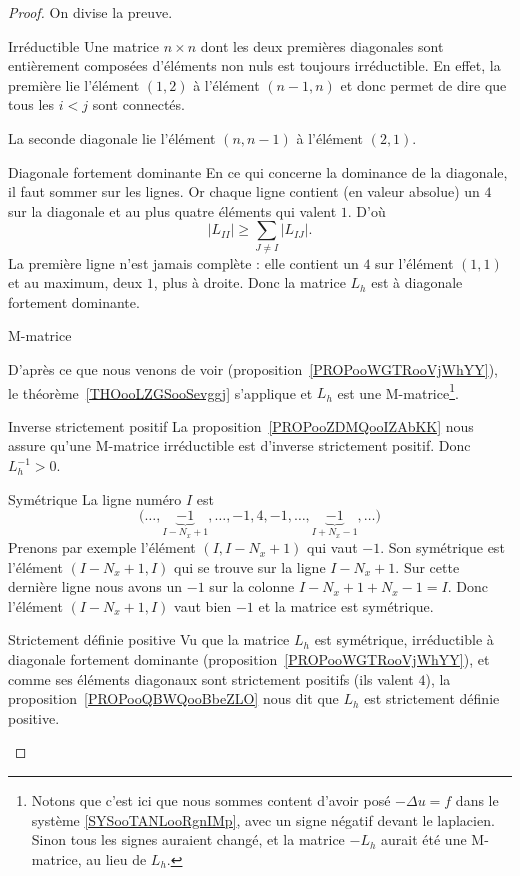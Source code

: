 \begin{proof}
	On divise la preuve.
	\begin{subproof}
		\item[Irréductible]
		Une matrice \( n\times n\) dont les deux premières diagonales sont entièrement composées d'éléments non nuls est toujours irréductible. En effet, la première lie l'élément \( (1,2)\) à l'élément \( (n-1,n)\) et donc permet de dire que tous les \( i<j\) sont connectés.

		La seconde diagonale lie l'élément \( (n,n-1)\) à l'élément \( (2,1)\).

		\item[Diagonale fortement dominante]
		En ce qui concerne la dominance de la diagonale, il faut sommer sur les lignes. Or chaque ligne contient (en valeur absolue) un \( 4\) sur la diagonale et au plus quatre éléments qui valent \( 1\). D'où
		\begin{equation}
			| L_{II} |\geq \sum_{J\neq I}| L_{IJ} |.
		\end{equation}
		La première ligne n'est jamais complète : elle contient un \( 4\) sur l'élément \( (1,1)\) et au maximum, deux \( 1\), plus à droite. Donc la matrice \( L_h\) est à diagonale fortement dominante.

		\item[M-matrice]
            
		D'après ce que nous venons de voir (proposition~\ref{PROPooWGTRooVjWhYY}), le théorème~\ref{THOooLZGSooSevggj} s'applique et \( L_h\) est une M-matrice\footnote{Notons que c'est ici que nous sommes content d'avoir posé \( -\Delta u=f\) dans le système \eqref{SYSooTANLooRgnIMp}, avec un signe négatif devant le laplacien. Sinon tous les signes auraient changé, et la matrice \( -L_h\) aurait été une M-matrice, au lieu de \( L_h\).}.

		\item[Inverse strictement positif]
		La proposition~\ref{PROPooZDMQooIZAbKK} nous assure qu'une M-matrice irréductible est d'inverse strictement positif. Donc \( L_h^{-1}>0\).

		\item[Symétrique]
		La ligne numéro \( I\) est
		\begin{equation}
			\big( \ldots ,\underbrace{-1}_{I-N_x+1},\ldots,-1,4,-1,\ldots,\underbrace{-1}_{I+N_x-1},\ldots \big)
		\end{equation}
		Prenons par exemple l'élément \( (I,I-N_x+1)\) qui vaut \( -1\). Son symétrique est l'élément \( (I-N_x+1,I)\) qui se trouve sur la ligne \( I-N_x+1\). Sur cette dernière ligne nous avons un \( -1\) sur la colonne \( I-N_x+1+N_x-1=I\). Donc l'élément \( (I-N_x+1,I)\) vaut bien \( -1\) et la matrice est symétrique.

		\item[Strictement définie positive]
		Vu que la matrice \( L_h\) est symétrique, irréductible à diagonale fortement dominante (proposition~\ref{PROPooWGTRooVjWhYY}), et comme ses éléments diagonaux sont strictement positifs (ils valent \( 4\)), la proposition~\ref{PROPooQBWQooBbeZLO} nous dit que \( L_h\) est strictement définie positive.
	\end{subproof}
\end{proof}

